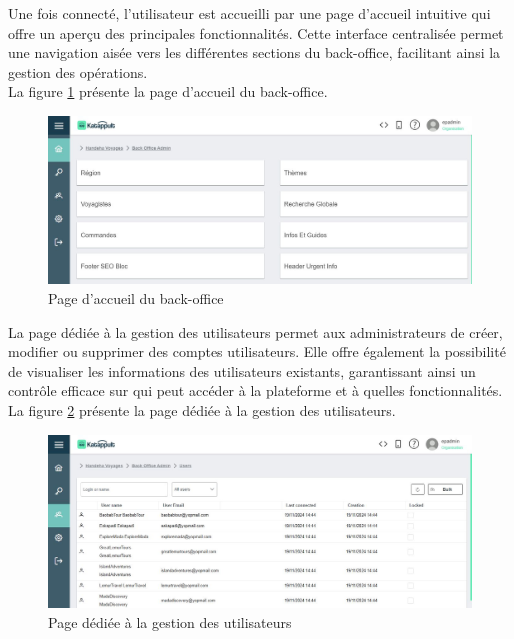 \documentclass[12pt]{report}
\begin{document}
			Une fois connecté, l'utilisateur est accueilli par une page d'accueil intuitive qui offre un aperçu des principales fonctionnalités. Cette interface centralisée permet une navigation aisée vers les différentes sections du back-office, facilitant ainsi la gestion des opérations.\\

		La figure \ref{fig:katappultAccueil} présente la page d’accueil du back-office.

		\begin{figure}[h]
			\centering
			\includegraphics[width=\textwidth]{katappultAccueil.png}
			\caption{Page d’accueil du back-office}
			\label{fig:katappultAccueil}
		\end{figure}
		\FloatBarrier

		La page dédiée à la gestion des utilisateurs permet aux administrateurs de créer, modifier ou supprimer des comptes utilisateurs. Elle offre également la possibilité de visualiser les informations des utilisateurs existants, garantissant ainsi un contrôle efficace sur qui peut accéder à la plateforme et à quelles fonctionnalités.\\

		La figure \ref{fig:katappultUser} présente la page dédiée à la gestion des utilisateurs.

		\begin{figure}[h]
			\centering
			\includegraphics[width=\textwidth]{katappultUser.png}
			\caption{Page dédiée à la gestion des utilisateurs}
			\label{fig:katappultUser}
		\end{figure}
		\FloatBarrier
\end{document}
